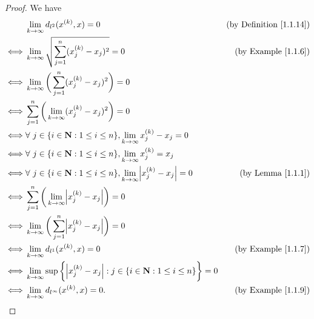 \begin{proof}
    We have
    \begin{align*}
             & \lim_{k \to \infty} d_{l^2}(x^{(k)}, x) = 0                                                                     & \text{(by Definition \ref{1.1.14})} \\
        \iff & \lim_{k \to \infty} \sqrt{\sum_{j = 1}^n (x_j^{(k)} - x_j)^2} = 0                                               & \text{(by Example \ref{1.1.6})}     \\
        \iff & \lim_{k \to \infty} \bigg(\sum_{j = 1}^n (x_j^{(k)} - x_j)^2\bigg) = 0                                                                                \\
        \iff & \sum_{j = 1}^n \bigg(\lim_{k \to \infty} (x_j^{(k)} - x_j)^2\bigg) = 0                                                                                \\
        \iff & \forall\ j \in \{i \in \mathbf{N} : 1 \leq i \leq n\}, \lim_{k \to \infty} x_j^{(k)} - x_j = 0                                                        \\
        \iff & \forall\ j \in \{i \in \mathbf{N} : 1 \leq i \leq n\}, \lim_{k \to \infty} x_j^{(k)} = x_j                                                            \\
        \iff & \forall\ j \in \{i \in \mathbf{N} : 1 \leq i \leq n\}, \lim_{k \to \infty} \abs*{x_j^{(k)} - x_j} = 0           & \text{(by Lemma \ref{1.1.1})}       \\
        \iff & \sum_{j = 1}^n \bigg(\lim_{k \to \infty} \abs*{x_j^{(k)} - x_j}\bigg) = 0                                                                             \\
        \iff & \lim_{k \to \infty} \bigg(\sum_{j = 1}^n \abs*{x_j^{(k)} - x_j}\bigg) = 0                                                                             \\
        \iff & \lim_{k \to \infty} d_{l^1}(x^{(k)}, x) = 0                                                                     & \text{(by Example \ref{1.1.7})}     \\
        \iff & \lim_{k \to \infty} \sup\bigg\{\abs*{x_j^{(k)} - x_j} : j \in \{i \in \mathbf{N} : 1 \leq i \leq n\}\bigg\} = 0                                       \\
        \iff & \lim_{k \to \infty} d_{l^\infty}(x^{(k)}, x) = 0.                                                               & \text{(by Example \ref{1.1.9})}
    \end{align*}
\end{proof}

